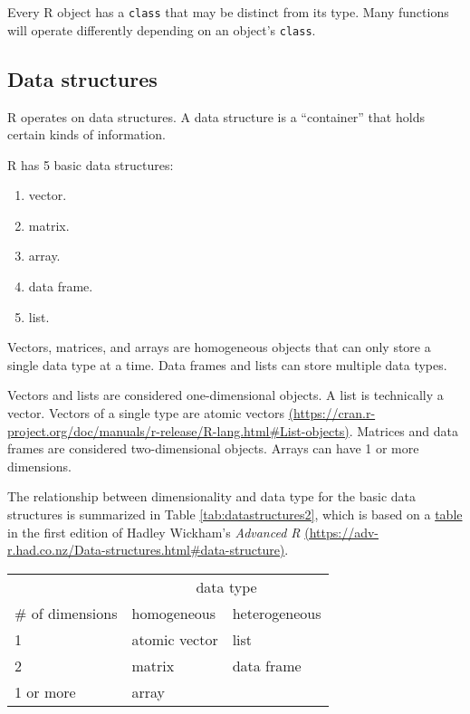 \documentclass[
]{book}
\providecommand{\tightlist}{%
  \setlength{\itemsep}{0pt}\setlength{\parskip}{0pt}}
\theoremstyle{definition}
\theoremstyle{definition}
\theoremstyle{definition}
\theoremstyle{definition}
\theoremstyle{remark}
\begin{document}
Every R object has a \texttt{class} that may be distinct from its type. Many functions will operate differently depending on an object's \texttt{class}.

\hypertarget{data-structures}{%
\subsection{Data structures}\label{data-structures}}

R operates on data structures. A data structure is a ``container'' that holds certain kinds of information.

R has 5 basic data structures:

\begin{enumerate}
\def\labelenumi{\arabic{enumi}.}
\tightlist
\item
  vector.
\item
  matrix.
\item
  array.
\item
  data frame.
\item
  list.
\end{enumerate}

Vectors, matrices, and arrays are homogeneous objects that can only store a single data type at a time. Data frames and lists can store multiple data types.

Vectors and lists are considered one-dimensional objects. A list is technically a vector. Vectors of a single type are atomic vectors \href{https://cran.r-project.org/doc/manuals/r-release/R-lang.html\#List-objects}{(https://cran.r-project.org/doc/manuals/r-release/R-lang.html\#List-objects)}. Matrices and data frames are considered two-dimensional objects. Arrays can have 1 or more dimensions.

The relationship between dimensionality and data type for the basic data structures is summarized in Table \ref{tab:datastructures2}, which is based on a \href{https://adv-r.had.co.nz/Data-structures.html\#data-structure}{table} in the first edition of Hadley Wickham's \emph{Advanced R} \href{https://adv-r.had.co.nz/Data-structures.html\#data-structure}{(https://adv-r.had.co.nz/Data-structures.html\#data-structure)}.

\begin{longtable}{l|ll}
\toprule
\multicolumn{1}{l}{} & \multicolumn{2}{c}{data type} \\ 
\cmidrule(lr){2-3}
\multicolumn{1}{l}{\# of dimensions} & homogeneous & heterogeneous \\ 
\midrule
1 & atomic vector & list \\ 
2 & matrix & data frame \\ 
1 or more & array &  \\ 
\bottomrule
\end{longtable}
\end{document}
